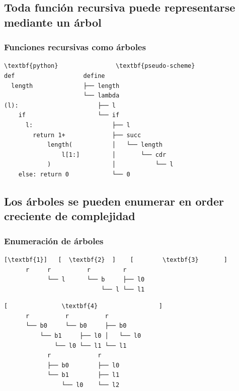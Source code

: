 \documentclass[xcolor=x11names,compress]{beamer}
\renewcommand{\(}{\begin{columns}}
\renewcommand{\)}{\end{columns}}
\newcommand{\<}[1]{\begin{column}{#1}}
\renewcommand{\>}{\end{column}}
\begin{document}
\subsection{Toda función recursiva puede representarse mediante un árbol}
\begin{frame}[fragile]
    \frametitle{Funciones recursivas como árboles}
    \codeLengthRecursionSmall
\begin{Verbatim}[commandchars=\\\{\},codes={\catcode`$=3\catcode`_=8}]
\textbf{python}                \textbf{pseudo-scheme}
def                   define                    
  length              ├── length                
                      └── lambda                
(l):                      ├── l                 
    if                    └── if                
      l:                      ├── l             
        return 1+             ├── succ          
            length(           │   └── length    
                l[1:]         │       └── cdr   
            )                 │           └── l 
    else: return 0            └── 0             
\end{Verbatim}
\end{frame}

\subsection{Los árboles se pueden enumerar en order creciente de complejidad \pause}
\begin{frame}[fragile]
    \frametitle{Enumeración de árboles}
\begin{Verbatim}[commandchars=\\\{\},codes={\catcode`$=3\catcode`_=8}]
     [\textbf{1}]   [  \textbf{2}  ]    [        \textbf{3}       ]
      r     r          r         r
            └── l      └── b     ├── l0
                           └── l └── l1
\end{Verbatim}

\pause

\begin{Verbatim}[commandchars=\\\{\},codes={\catcode`$=3\catcode`_=8}]
     [               \textbf{4}                 ]
      r          r          r         
      └── b0     └── b0     ├── b0    
          └── b1     ├── l0 │   └── l0
              └── l0 └── l1 └── l1    
            r             r
            ├── b0        ├── l0
            └── b1        ├── l1
                └── l0    └── l2
\end{Verbatim}



\end{frame}
\end{document}
